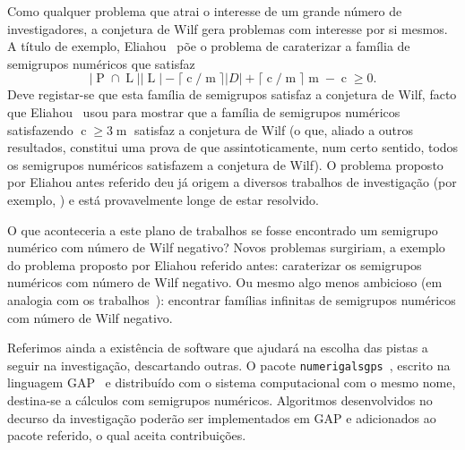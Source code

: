\documentclass[12pt]{amsart}
\numberwithin{table}{section}
\numberwithin{figure}{section}
\numberwithin{equation}{section}
\DeclareMathOperator{\conductoroper}{c} %
\DeclareMathOperator{\multiplicityoper}{m} %
\DeclareMathOperator{\leftsoper}{L} %
\DeclareMathOperator{\primitivesoper}{P} %
\theoremstyle{definition}
\theoremstyle{remark}
\begin{document}
Como qualquer problema que atrai o interesse de um grande número de investigadores, a conjetura de Wilf gera problemas com interesse por si mesmos. A título de exemplo, Eliahou~\cite{Eliahou2018JEMS-Wilfs} põe o problema de caraterizar a família de semigrupos numéricos que satisfaz 
\begin{equation*}
\lvert \primitivesoper\cap \leftsoper\rvert\lvert \leftsoper \rvert - \lceil{\conductoroper/\multiplicityoper}\rceil \lvert D\rvert + \lceil{\conductoroper/\multiplicityoper}\rceil\multiplicityoper - \conductoroper \ge 0.
\end{equation*}
Deve registar-se que esta família de semigrupos satisfaz a conjetura de Wilf, facto que Eliahou~\cite{Eliahou2018JEMS-Wilfs} usou para mostrar que a família de semigrupos numéricos satisfazendo \(\conductoroper\ge 3\multiplicityoper\) satisfaz a conjetura de Wilf (o que, aliado a outros resultados, constitui uma prova de que assintoticamente, num certo sentido, todos os semigrupos numéricos satisfazem a conjetura de Wilf).
O problema proposto por Eliahou antes referido deu já origem a diversos trabalhos de investigação (por exemplo, \cite{Delgado2018MZ-question,EliahouFromentin2019SF-misses}) e está provavelmente longe de estar resolvido.

O que aconteceria a este plano de trabalhos se fosse encontrado um semigrupo numérico com número de Wilf negativo? Novos problemas surgiriam, a exemplo do problema proposto por Eliahou referido antes: caraterizar os semigrupos numéricos com número de Wilf negativo. Ou mesmo algo menos ambicioso (em analogia com os trabalhos~\cite{Delgado2018MZ-question,EliahouFromentin2019SF-misses}): encontrar famílias infinitas de semigrupos numéricos com número de Wilf negativo. 
\smallskip

Referimos ainda a existência de software que ajudará na escolha das pistas a seguir na investigação, descartando outras. O pacote \texttt{numerigalsgps}~\cite{NumericalSgps1.4.0}, escrito na linguagem GAP~\cite{GAP4.14.0} e distribuído com o sistema computacional com o mesmo nome, destina-se a cálculos com semigrupos numéricos. Algoritmos desenvolvidos no decurso da investigação poderão ser implementados em GAP e adicionados ao pacote referido, o qual aceita contribuições.
\end{document}
